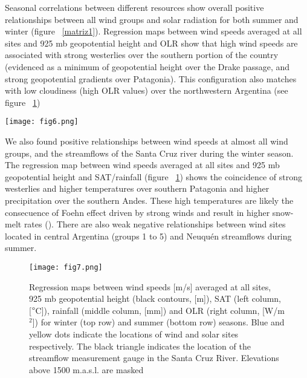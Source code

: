 \documentclass[AMA,Times1COL]{WileyNJDv5} %
\begin{document}
\begin{linenumbers}
Seasonal correlations between different resources show overall positive relationships between all wind groups and solar radiation for both summer and winter (figure ~\ref{matriz1}). Regression maps between wind speeds averaged at all sites and 925 mb geopotential height and OLR show that high wind speeds are associated with strong westerlies over the southern portion of the country (evidenced as a minimum of geopotential height over the Drake passage, and strong geopotential gradients over Patagonia). This configuration also matches with low cloudiness (high OLR values) over the northwestern Argentina (see figure ~\ref{reg1})                                    

\begin{figure*}[hbpt]
	\centering
	\hspace*{-1cm}   
	\texttt{[image: fig6.png]}
	\caption{\label{matriz1} Correlation matrices between seasonally averaged wind speeds, solar radiation, and streamflows. Statistically significant correlations at the 90\% confidence level are indicated by their numerical values.}
\end{figure*}

We also found positive relationships between wind speeds at almost all wind groups, and the streamflows of the Santa Cruz river during the winter season. The regression map between wind speeds averaged at all sites and 925 mb geopotential height and SAT/rainfall (figure ~\ref{reg1}) shows the coincidence of strong westerlies and higher temperatures over southern Patagonia and higher precipitation over the southern Andes. These high temperatures are likely the consecuence of Foehn effect driven by strong winds and result in higher snow-melt rates (\cite{bozkurt2018foehn}). There are also weak negative relationships between wind sites located in central Argentina (groups 1 to 5) and Neuquén streamflows during summer.

\begin{figure}[hbpt]
	\centering
	\hspace*{0cm}   
	\texttt{[image: fig7.png]}
	
	\caption{\label{reg1} Regression maps between wind speeds [m/s] averaged at all sites, 925 mb geopotential  height (black contours, [m]), SAT (left column, [$\degree$C]), rainfall (middle column, [mm]) and OLR (right column, [W/m$^2$]) for winter (top row) and summer (bottom row) seasons. Blue and yellow dots indicate the locations of wind and solar sites respectively. The black triangle indicates the location of the streamflow measurement gauge in the Santa Cruz River. Elevations above 1500 m.a.s.l. are masked}
\end{figure}


\end{linenumbers}
\end{document}

